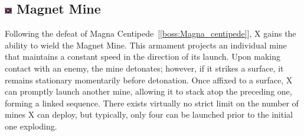 \subsection{\includegraphics[width=12px, height=10px]{figures/X2/weapons/M_mine.png} Magnet Mine}\label{Magnet_mine}

Following the defeat of Magna Centipede~[\ref{boss:Magna_centipede}], X gains the ability to wield the Magnet Mine. This armament projects an individual mine that maintains a constant speed in the direction of its launch. Upon making contact with an enemy, the mine detonates; however, if it strikes a surface, it remains stationary momentarily before detonation. Once affixed to a surface, X can promptly launch another mine, allowing it to stack atop the preceding one, forming a linked sequence. There exists virtually no strict limit on the number of mines X can deploy, but typically, only four can be launched prior to the initial one exploding.
